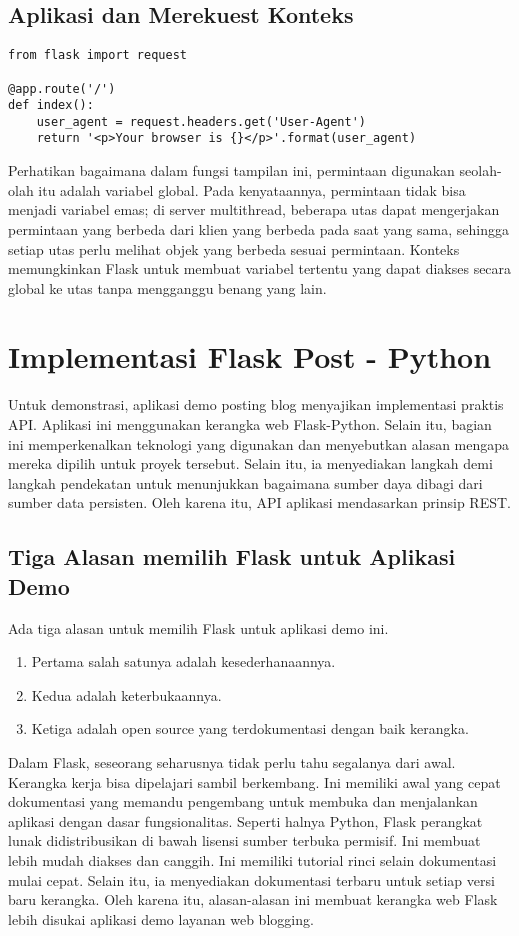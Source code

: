 \subsection{Aplikasi dan Merekuest Konteks}
\begin{verbatim}
from flask import request

@app.route('/')
def index():
	user_agent = request.headers.get('User-Agent')
	return '<p>Your browser is {}</p>'.format(user_agent)
\end{verbatim}
Perhatikan bagaimana dalam fungsi tampilan ini, permintaan digunakan seolah-olah itu adalah variabel global. Pada kenyataannya, permintaan tidak bisa menjadi variabel emas; di server multithread, beberapa utas dapat mengerjakan permintaan yang berbeda dari klien yang berbeda pada saat yang sama, sehingga setiap utas perlu melihat objek yang berbeda sesuai permintaan. Konteks memungkinkan Flask untuk membuat variabel tertentu yang dapat diakses secara global ke utas tanpa mengganggu benang yang lain\cite{grinberg2018flask}.

\section{Implementasi Flask Post - Python}
Untuk demonstrasi, aplikasi demo posting blog menyajikan implementasi praktis API. Aplikasi ini menggunakan kerangka web Flask-Python. Selain itu, bagian ini memperkenalkan teknologi yang digunakan dan menyebutkan alasan mengapa mereka dipilih untuk proyek tersebut. Selain itu, ia menyediakan langkah demi langkah pendekatan untuk menunjukkan bagaimana sumber daya dibagi dari sumber data persisten. Oleh karena itu, API aplikasi mendasarkan prinsip REST\cite{alemu2014rest}.

\subsection{Tiga Alasan memilih Flask untuk Aplikasi Demo}
Ada tiga alasan untuk memilih Flask untuk aplikasi demo ini.
\begin{enumerate}
\item Pertama salah satunya adalah kesederhanaannya.
\item Kedua adalah keterbukaannya.
\item Ketiga adalah open source yang terdokumentasi dengan baik kerangka.
\end{enumerate}
Dalam Flask, seseorang seharusnya tidak perlu tahu segalanya dari awal. Kerangka kerja bisa dipelajari sambil berkembang. Ini memiliki awal yang cepat dokumentasi yang memandu pengembang untuk membuka dan menjalankan aplikasi dengan dasar fungsionalitas. Seperti halnya Python, Flask perangkat lunak didistribusikan di bawah lisensi sumber terbuka permisif. Ini membuat lebih mudah diakses dan canggih.  Ini memiliki tutorial rinci selain dokumentasi mulai cepat. Selain itu, ia menyediakan dokumentasi terbaru untuk setiap versi baru kerangka. Oleh karena itu, alasan-alasan ini membuat kerangka web Flask lebih disukai aplikasi demo layanan web blogging\cite{alemu2014rest}.

